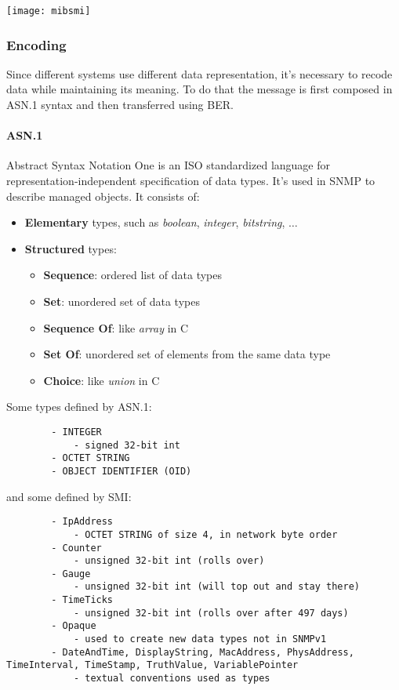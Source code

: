 \begin{center}
	\texttt{[image: mibsmi]}
\end{center}

\subsubsection{Encoding}
Since different systems use different data representation, it's necessary to recode data while maintaining its meaning. To do that the message is first composed in ASN.1 syntax and then transferred using BER.
\paragraph{ASN.1}
Abstract Syntax Notation One is an ISO standardized language for representation-independent specification of data types. It's used in SNMP to describe managed objects. It consists of:
\begin{itemize}
	\item \textbf{Elementary} types, such as \textit{boolean}, \textit{integer}, \textit{bitstring}, $\ldots$
	\item \textbf{Structured} types:
	\begin{itemize}
		\item \textbf{Sequence}: ordered list of data types
		\item \textbf{Set}: unordered set of data types
		\item \textbf{Sequence Of}: like \textit{array} in C
		\item \textbf{Set Of}: unordered set of elements from the same data type
		\item \textbf{Choice}: like \textit{union} in C
	\end{itemize}
\end{itemize}
\begin{example}
	Some types defined by ASN.1:
	\begin{lstlisting}
		- INTEGER
			- signed 32-bit int
		- OCTET STRING
		- OBJECT IDENTIFIER (OID)
	\end{lstlisting}
	and some defined by SMI:
	\begin{lstlisting}
		- IpAddress
			- OCTET STRING of size 4, in network byte order
		- Counter
			- unsigned 32-bit int (rolls over)
		- Gauge
			- unsigned 32-bit int (will top out and stay there)
		- TimeTicks
			- unsigned 32-bit int (rolls over after 497 days)
		- Opaque
			- used to create new data types not in SNMPv1
		- DateAndTime, DisplayString, MacAddress, PhysAddress, TimeInterval, TimeStamp, TruthValue, VariablePointer
			- textual conventions used as types
	\end{lstlisting}
\end{example}

